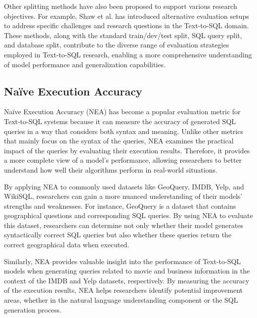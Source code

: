 Other splitting methods have also been proposed to support various research objectives. For example, Shaw et al. \cite{shaw-etal-2021-compositional} has introduced alternative evaluation setups to address specific challenges and research questions in the Text-to-SQL domain. These methods, along with the standard train/dev/test split, SQL query split, and database split, contribute to the diverse range of evaluation strategies employed in Text-to-SQL research, enabling a more comprehensive understanding of model performance and generalization capabilities.



\subsection{Naïve Execution Accuracy}

Naïve Execution Accuracy (NEA) has become a popular evaluation metric for Text-to-SQL systems because it can measure the accuracy of generated SQL queries in a way that considers both syntax and meaning. Unlike other metrics that mainly focus on the syntax of the queries, NEA examines the practical impact of the queries by evaluating their execution results. Therefore, it provides a more complete view of a model's performance, allowing researchers to better understand how well their algorithms perform in real-world situations.

By applying NEA to commonly used datasets like GeoQuery, IMDB, Yelp, and WikiSQL, researchers can gain a more nuanced understanding of their models' strengths and weaknesses. For instance, GeoQuery is a dataset that contains geographical questions and corresponding SQL queries. By using NEA to evaluate this dataset, researchers can determine not only whether their model generates syntactically correct SQL queries but also whether these queries return the correct geographical data when executed.

Similarly, NEA provides valuable insight into the performance of Text-to-SQL models when generating queries related to movie and business information in the context of the IMDB and Yelp datasets, respectively. By measuring the accuracy of the execution results, NEA helps researchers identify potential improvement areas, whether in the natural language understanding component or the SQL generation process.

